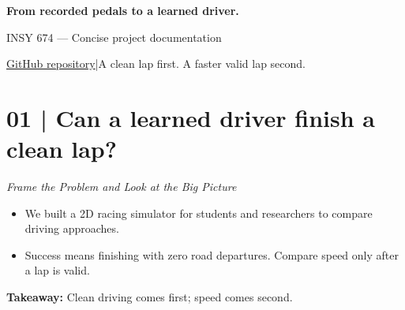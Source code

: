 \documentclass[10pt,a4paper]{article}
\newcommand{\takeaway}[1]{\begin{tcolorbox}[colback=paperblue,colframe=paperblue,boxrule=0pt]#1\end{tcolorbox}}
\begin{document}
{\LARGE\bfseries From recorded pedals to a learned driver.}\par
INSY 674 --- Concise project documentation\par
\href{https://github.com/amani-1110/INSY-674-Project}{GitHub repository}\quad |\quad A clean lap first. A faster valid lap second.

\section*{01 | Can a learned driver finish a clean lap?}
{\small\textit{Frame the Problem and Look at the Big Picture}}
\begin{itemize}
\item We built a 2D racing simulator for students and researchers to compare driving approaches.
\item Success means finishing with zero road departures. Compare speed only after a lap is valid.
\end{itemize}
\takeaway{\textbf{Takeaway:} Clean driving comes first; speed comes second.}
\end{document}
